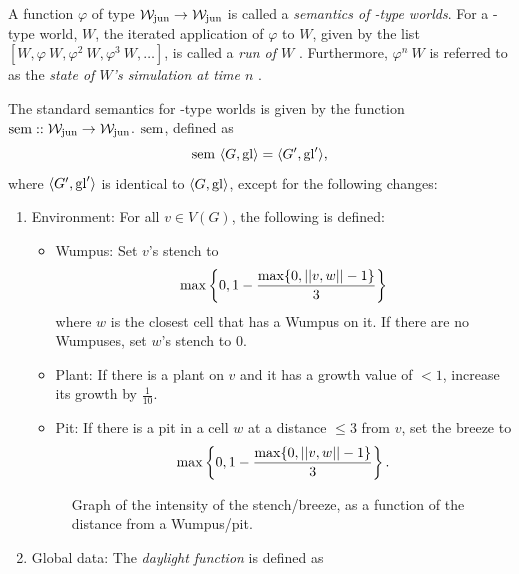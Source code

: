 \begin{definition}
A function $\varphi$ of type $\mathcal{W}_{\mathrm{jun}} \rightarrow \mathcal{W}_{\mathrm{jun}}$ is called a {\em semantics of \wjun-type worlds}.
For a \wjun-type world, $W$, the iterated application of $\varphi$ to $W$, given by the list ${[W, \varphi\ W, \varphi^2\ W, \varphi^3\ W, \dots]}$, is called a {\em run of $W$ }. Furthermore, $\varphi^n\ W$ is referred to as the {\em state of $W$'s simulation at time $n$ }.
\end{definition}

\begin{definition}
\label{def:ssem}
The standard semantics for \wjun-type worlds is given by the function $\mathrm{sem} :: \mathtt{\mathcal{W}_{\mathrm{jun}} \rightarrow \mathcal{W}_{\mathrm{jun}}}$. $\mathrm{sem}$, defined as 
$$\mathrm{sem}\ \langle G, \mathrm{gl} \rangle = \langle G', \mathrm{gl}' \rangle, $$
where $\langle G', \mathrm{gl}' \rangle$ is identical to $\langle G, \mathrm{gl} \rangle$, except for the following changes:

\begin{enumerate}
	\item {\upshape Environment:} For all $v \in V(G)$, the following is defined:
	
	\begin{itemize}
		\item {\upshape Wumpus:} Set $v$'s stench to
		$$
			\mathrm{max}\left\{0, 1 - \frac{\mathrm{max}\{0,||{v},{w}||-1\}}{3}\right\}
		$$
		where $w$ is the closest cell that has a Wumpus on it. If there are no Wumpuses, set $w$'s stench to 0.
		
		\item {\upshape Plant:} If there is a plant on $v$ and it has a growth value of $< 1$, increase its growth by $\frac{1}{10}$.
		
		\item {\upshape Pit:} If there is a pit in a cell $w$ at a distance $\leq 3$ from $v$, set the breeze to
 		$$
			\mathrm{max}\left\{0, 1 - \frac{\mathrm{max}\{0,||{v},{w}||-1\}}{3}\right\}.
		$$
	\end{itemize}
	
	\begin{figure}
		\centering
		\label{fig:stenchIntensity}
		
		\caption{Graph of the intensity of the stench/breeze, as a function of the distance from a Wumpus/pit.}
	\end{figure}
	
	\item {\upshape Global data:} The {\em daylight function} is defined as
	

\end{enumerate}
\end{definition}
